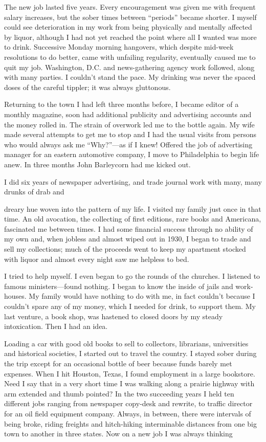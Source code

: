 The new job lasted five years. Every encouragement was given me with frequent salary increases, but the sober times between “periods” became shorter. I myself could see deterioration in my work from being physically and mentally affected by liquor, although I had not yet reached the point where all I wanted was more to drink. Successive Monday morning hangovers, which despite mid-week resolutions to do better, came with unfailing regularity, eventually caused me to quit my job. Washington, D.C. and news-gathering agency work followed, along with many parties. I couldn’t stand the pace. My drinking was never the spaced doses of the careful tippler; it was always gluttonous.

Returning to the town I had left three months before, I became editor of a monthly magazine, soon had additional publicity and advertising accounts and the money rolled in. The strain of overwork led me to the bottle again. My wife made several attempts to get me to stop and I had the usual visits from persons who would always ask me “Why?”—as if I knew! Offered the job of advertising manager for an eastern automotive company, I move to Philadelphia to begin life anew. In three months John Barleycorn had me kicked out.

I did six years of newspaper advertising, and trade journal work with many, many drunks of drab and

dreary hue woven into the pattern of my life. I visited my family just once in that time. An old avocation, the collecting of first editions, rare books and Americana, fascinated me between times. I had some financial success through no ability of my own and, when jobless and almost wiped out in 1930, I began to trade and sell my collections; much of the proceeds went to keep my apartment stocked with liquor and almost every night saw me helpless to bed.

I tried to help myself. I even began to go the rounds of the churches. I listened to famous ministers—found nothing. I began to know the inside of jails and work-houses. My family would have nothing to do with me, in fact couldn’t because I couldn’t spare any of my money, which I needed for drink, to support them. My last venture, a book shop, was hastened to closed doors by my steady intoxication. Then I had an idea.

Loading a car with good old books to sell to collectors, librarians, universities and historical societies, I started out to travel the country. I stayed sober during the trip except for an occasional bottle of beer because funds barely met expenses. When I hit Houston, Texas, I found employment in a large bookstore. Need I say that in a very short time I was walking along a prairie highway with arm extended and thumb pointed? In the two succeeding years I held ten different jobs ranging from newspaper copy-desk and rewrite, to traffic director for an oil field equipment company. Always, in between, there were intervals of being broke, riding freights and hitch-hiking interminable distances from one big town to another in three states. Now on a new job I was always thinking

